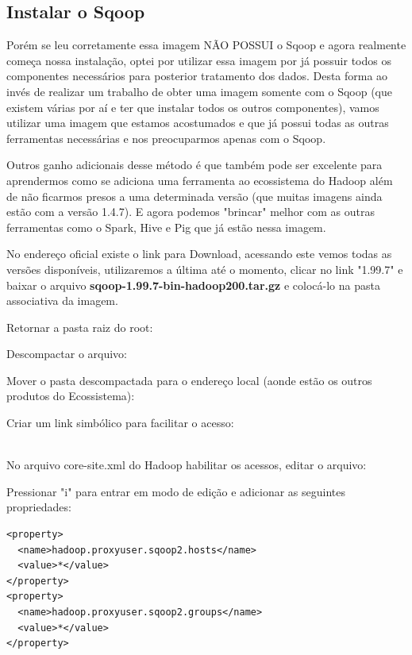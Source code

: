 \documentclass[a4paper,11pt]{article}
\begin{document}


\subsection{Instalar o Sqoop}
Porém se leu corretamente essa imagem NÃO POSSUI o Sqoop e agora realmente começa nossa instalação, optei por utilizar essa imagem por já possuir todos os componentes necessários para posterior tratamento dos dados. Desta forma ao invés de realizar um trabalho de obter uma imagem somente com o Sqoop (que existem várias por aí e ter que instalar todos os outros componentes), vamos utilizar uma imagem que estamos acostumados e que já possui todas as outras ferramentas necessárias e nos preocuparmos apenas com o Sqoop.

Outros ganho adicionais desse método é que também pode ser excelente para aprendermos como se adiciona uma ferramenta ao ecossistema do Hadoop além de não ficarmos presos a uma determinada versão (que muitas imagens ainda estão com a versão 1.4.7). E agora podemos "brincar" melhor com as outras ferramentas como o Spark, Hive e Pig que já estão nessa imagem.

No endereço oficial \cite{scoopoficial} existe o link para Download, acessando este vemos todas as versões disponíveis, utilizaremos a última até o momento, clicar no link "1.99.7" e baixar o arquivo \textbf{sqoop-1.99.7-bin-hadoop200.tar.gz} e colocá-lo na pasta associativa da imagem.

Retornar a pasta raiz do root: \\

Descompactar o arquivo: \\

Mover o pasta descompactada para o endereço local (aonde estão os outros produtos do Ecossistema): \\

Criar um link simbólico para facilitar o acesso: \\
 \\

No arquivo core-site.xml do Hadoop habilitar os acessos, editar o arquivo: \\

Pressionar "i" para entrar em modo de edição e adicionar as seguintes propriedades:
\begin{lstlisting}[]
<property>
  <name>hadoop.proxyuser.sqoop2.hosts</name>
  <value>*</value>
</property>
<property>
  <name>hadoop.proxyuser.sqoop2.groups</name>
  <value>*</value>
</property>
\end{lstlisting}
\end{document}
